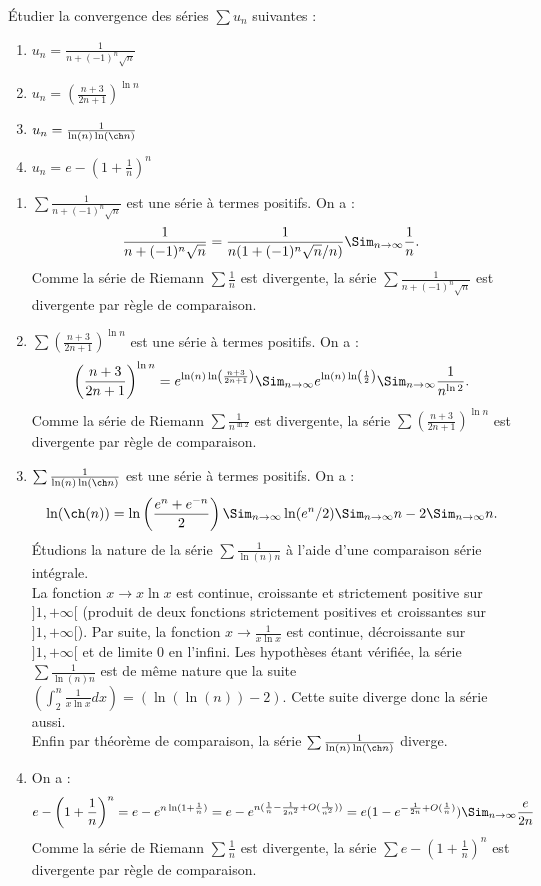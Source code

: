 \documentclass{book}
\begin{document}
\begin{Exercice}[Nature]
Étudier la convergence des séries $\sum u_n$ suivantes :\\
    \begin{enumerate}
        \item  $u_n=\frac{1}{n+(-1)^n\sqrt{n}}$
        \item $u_n=\left(\frac{n+3}{2n+1}\right)^{\ln n}$
        \item  $u_n=\frac{1}{\ln(n)\ln(\ch n)}$
        \item  $u_n=e-\left(1+\frac{1}{n}\right)^n$
      \end{enumerate}      
       



\begin{Correction}
    \begin{enumerate}
        \item $\sum \frac{1}{n+(-1)^n\sqrt{n}}$ est une série à termes positifs. On a :
$$\frac{1}{n+(-1)^n\sqrt{n}} = \frac{1}{n(1+(-1)^n\sqrt{n}/n)}\Sim_{n\to\infty}\frac{1}{n}.$$
Comme la série de Riemann $\sum \frac{1}{n}$ est divergente, la série $\sum \frac{1}{n+(-1)^n\sqrt{n}}$ est divergente par règle de comparaison.
        \item $\sum \left(\frac{n+3}{2n+1}\right)^{\ln n}$ est une série à termes positifs. On a :
$$\left(\frac{n+3}{2n+1}\right)^{\ln n} =e^{\ln(n)\ln\left(\frac{n+3}{2n+1}\right) } \Sim_{n\to\infty}e^{\ln(n)\ln\left(\frac{1}{2}\right) }\Sim_{n\to\infty}\frac{1}{n^{\ln 2}} .$$
Comme la série de Riemann $\sum \frac{1}{n^{\ln 2}}$ est divergente, la série $\sum \left(\frac{n+3}{2n+1}\right)^{\ln n}$ est divergente par règle de comparaison.
\item $\sum\frac{1}{\ln(n)\ln(\ch n)}$ est une série à termes positifs. On a :
$$\ln(\ch(n)) = \ln\left(  \frac{e^n+e^{-n}}{2}\right)\Sim_{n\to\infty}\ln(e^n/2  )\Sim_{n\to\infty}n-2\Sim_{n\to\infty}n.$$
Étudions la nature de la série $\sum \frac{1}{\ln(n)n}$ à l'aide d'une comparaison série intégrale.\\
La fonction $x\rightarrow x\ln x$ est continue, croissante et strictement positive sur $]1,+\infty[$ (produit de deux fonctions strictement positives et croissantes sur $]1,+\infty[$). Par suite, la fonction $x\rightarrow\frac{1}{x\ln x}$ est continue, décroissante sur $]1,+\infty[$ et de limite 0 en l'infini. Les hypothèses étant vérifiée, la série $\sum \frac{1}{\ln(n)n}$ est de même nature que la suite $\left(\int_{2}^n \frac{1}{x\ln x}dx\right)=\left(\ln(\ln(n))-2\right)$. Cette suite diverge donc la série aussi.\\
Enfin par théorème de comparaison, la série $\sum\frac{1}{\ln(n)\ln(\ch n)}$ diverge.
\item On a :
$$ e-\left(1+\frac{1}{n}\right)^n=e-e^{n\ln(1+\frac{1}{n})}=e-e^{n(\frac{1}{n}-\frac{1}{2n^2}+O(\frac{1}{n^2}))}=e(1-e^{-\frac{1}{2n}+O(\frac{1}{n})})\Sim_{n\to\infty}\frac{e}{2n}  $$
Comme la série de Riemann $\sum \frac{1}{n}$ est divergente, la série $\sum e-\left(1+\frac{1}{n}\right)^n$ est divergente par règle de comparaison.
    \end{enumerate}
\end{Correction}
\end{Exercice}
\end{document}
